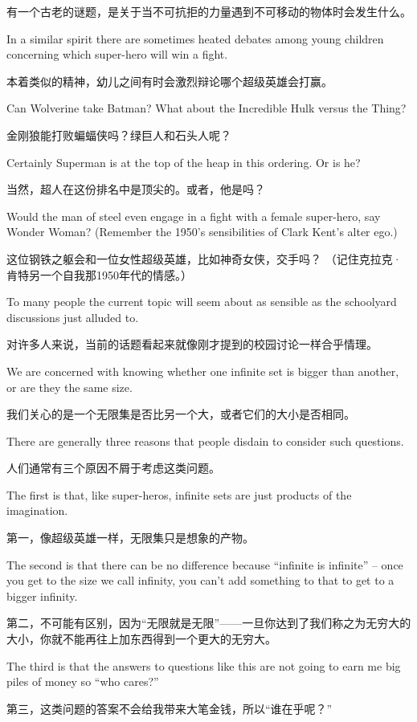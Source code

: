 有一个古老的谜题，是关于当不可抗拒的力量遇到不可移动的物体时会发生什么。

In a similar spirit there are sometimes heated
debates among young children concerning which super-hero will win a fight.

本着类似的精神，幼儿之间有时会激烈辩论哪个超级英雄会打赢。

Can Wolverine take Batman?  What about the Incredible Hulk versus the
Thing?

金刚狼能打败蝙蝠侠吗？绿巨人和石头人呢？

Certainly Superman is at the top of the heap in this ordering.  Or is
he?

当然，超人在这份排名中是顶尖的。或者，他是吗？

Would the man of steel even engage in a fight with a female super-hero,
say Wonder Woman?
(Remember the 1950's sensibilities of Clark Kent's
alter ego.)

这位钢铁之躯会和一位女性超级英雄，比如神奇女侠，交手吗？
（记住克拉克·肯特另一个自我那1950年代的情感。）

To many people the current topic will seem about as sensible as the schoolyard
discussions just alluded to.

对许多人来说，当前的话题看起来就像刚才提到的校园讨论一样合乎情理。

We are concerned with knowing whether
one infinite set is bigger than another, or are they the same size.

我们关心的是一个无限集是否比另一个大，或者它们的大小是否相同。

There are
generally three reasons that people disdain to consider such questions.

人们通常有三个原因不屑于考虑这类问题。

The
first is that, like super-heros, infinite sets are just products of the imagination.

第一，像超级英雄一样，无限集只是想象的产物。

The second is that there can be no difference because ``infinite is infinite'' --
once you get to the size we call infinity, you can't add something to that to
get to a bigger infinity.

第二，不可能有区别，因为“无限就是无限”——一旦你达到了我们称之为无穷大的大小，你就不能再往上加东西得到一个更大的无穷大。

The third is that the answers to questions like this
are not going to earn me big piles of money so ``who cares?''

第三，这类问题的答案不会给我带来大笔金钱，所以“谁在乎呢？”

